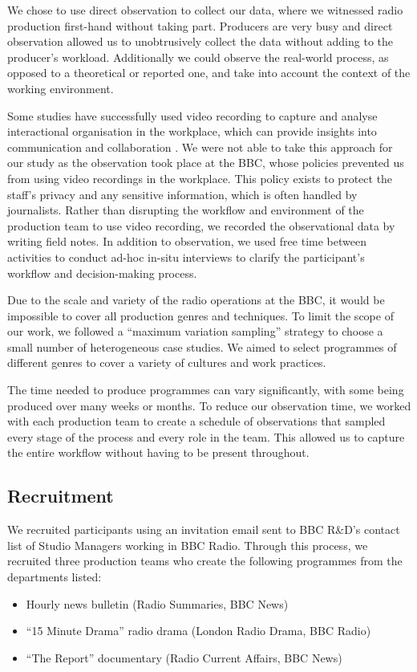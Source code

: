 We chose to use direct observation to collect our data, where we witnessed radio production first-hand without taking
part.  Producers are very busy and direct observation allowed us to unobtrusively collect the data without adding to
the producer's workload. Additionally we could observe the real-world process, as opposed to a theoretical or reported
one, and take into account the context of the working environment.

Some studies have successfully used video recording to capture and analyse interactional organisation in the workplace,
which can provide insights into communication and collaboration \citep[p.~16]{Luff2000}.  We were not able to take this
approach for our study as the observation took place at the BBC, whose policies prevented us from using video
recordings in the workplace.  This policy exists to protect the staff's privacy and any sensitive information, which is
often handled by journalists.  Rather than disrupting the workflow and environment of the production team to use video
recording, we recorded the observational data by writing field notes.  In addition to observation, we used free time
between activities to conduct ad-hoc in-situ interviews to clarify the participant's workflow and decision-making
process.

Due to the scale and variety of the radio operations at the BBC, it would be impossible to cover all production genres
and techniques. To limit the scope of our work, we followed a ``maximum variation sampling'' strategy \citep[p.
172]{Patton1990} to choose a small number of heterogeneous case studies. We aimed to select programmes of different
genres to cover a variety of cultures and work practices.

The time needed to produce programmes can vary significantly, with some being produced over many weeks or months. To
reduce our observation time, we worked with each production team to create a schedule of observations that sampled
every stage of the process and every role in the team. This allowed us to capture the entire workflow without having to
be present throughout.

\subsection{Recruitment}
We recruited participants using an invitation email sent to BBC R\&D's contact list of Studio Managers working in BBC
Radio. Through this process, we recruited three production teams who create the following programmes from the
departments listed:
\begin{itemize}
	\item Hourly news bulletin (Radio Summaries, BBC News)
	\item ``15 Minute Drama'' radio drama (London Radio Drama, BBC Radio)
	\item ``The Report'' documentary (Radio Current Affairs, BBC News)
\end{itemize}

